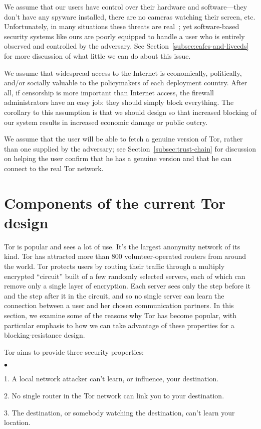 \documentclass{llncs}
\newenvironment{tightlist}{\begin{list}{$\bullet$}{
  \setlength{\itemsep}{0mm}
    \setlength{\parsep}{0mm}
    }}{\end{list}}
\begin{document}
We assume that our users have control over their hardware and
software---they don't have any spyware installed, there are no
cameras watching their screen, etc. Unfortunately, in many situations
these threats are real~\cite{zuckerman-threatmodels}; yet
software-based security systems like ours are poorly equipped to handle
a user who is entirely observed and controlled by the adversary. See
Section~\ref{subsec:cafes-and-livecds} for more discussion of what little
we can do about this issue.

We assume that widespread access to the Internet is economically,
politically, and/or
socially valuable to the policymakers of each deployment country. After
all, if censorship
is more important than Internet access, the firewall administrators have
an easy job: they should simply block everything. The corollary to this
assumption is that we should design so that increased blocking of our
system results in increased economic damage or public outcry.

We assume that the user will be able to fetch a genuine
version of Tor, rather than one supplied by the adversary; see
Section~\ref{subsec:trust-chain} for discussion on helping the user
confirm that he has a genuine version and that he can connect to the
real Tor network.

\section{Components of the current Tor design}
\label{sec:current-tor}

Tor is popular and sees a lot of use. It's the largest anonymity
network of its kind.
Tor has attracted more than 800 volunteer-operated routers from around the
world.  Tor protects users by routing their traffic through a multiply
encrypted ``circuit'' built of a few randomly selected servers, each of which
can remove only a single layer of encryption.  Each server sees only the step
before it and the step after it in the circuit, and so no single server can
learn the connection between a user and her chosen communication partners.
In this section, we examine some of the reasons why Tor has become popular,
with particular emphasis to how we can take advantage of these properties
for a blocking-resistance design.

Tor aims to provide three security properties:
\begin{tightlist}
\item 1. A local network attacker can't learn, or influence, your
destination.
\item 2. No single router in the Tor network can link you to your
destination.
\item 3. The destination, or somebody watching the destination,
can't learn your location.
\end{tightlist}
\end{document}
